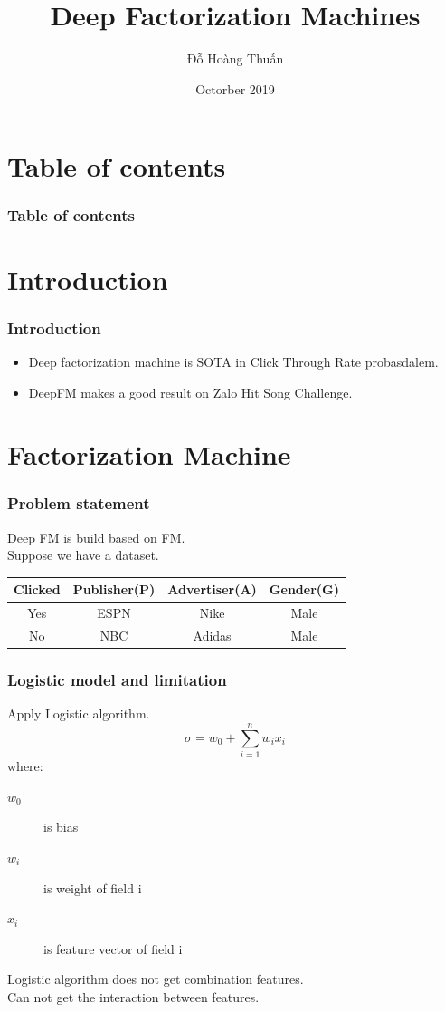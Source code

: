 \documentclass{beamer}
\title{Deep Factorization Machines}
\author{Đỗ Hoàng Thuấn}
\date{Octorber 2019}
\begin{document}
\frame{\titlepage}

\section{Table of contents}
\begin{frame}
\frametitle{Table of contents}
\tableofcontents
\end{frame}

\section{Introduction}
\begin{frame}
	\frametitle{Introduction}
	\begin{itemize}
 		\item Deep factorization machine is SOTA in Click Through Rate probasdalem.
 		\item DeepFM makes a good result on Zalo Hit Song Challenge.
	\end{itemize}
\end{frame}

\section{Factorization Machine}
\frame{\tableofcontents[currentsection]}
\begin{frame}
	\frametitle{Problem statement}
	Deep FM is build based on FM. \\
	Suppose we have a dataset. \\
	\begin{center}
		\begin{tabular}{|c|c|c|c|}
			\hline Clicked & Publisher(P) & Advertiser(A) & Gender(G) \\
			\hline Yes & ESPN & Nike & Male \\
			\hline No & NBC & Adidas & Male \\ \hline
		\end{tabular}
	\end{center}
		
\end{frame}

\begin{frame}
	\frametitle{Logistic model and limitation}
	Apply Logistic algorithm.
	\begin{equation}
		\sigma = w_{0} + \sum_{i=1}^{n} w_{i} x_{i} 
	\end{equation}
	where:
	\begin{description}
		\item[$w_0$] is bias
		\item[$w_i$] is weight of field i
		\item[$x_i$] is feature vector of field i 	
	\end{description}	
	Logistic algorithm does not get combination features. \\
	Can not get the interaction between features.
\end{frame}
\end{document}
